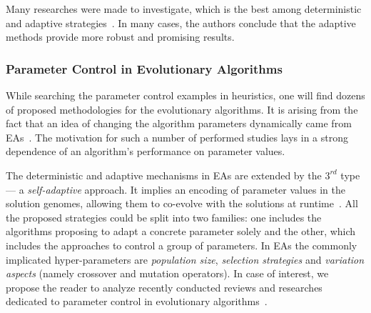 Many researches were made to investigate, which is the best among deterministic and adaptive strategies~\cite{thompson1995general,ingber2000adaptive,de2003placement,azizi2004adaptive,lou2016parallel}. In many cases, the authors conclude that the adaptive methods provide more robust and promising results.


\subsubsection{Parameter Control in Evolutionary Algorithms}
While searching the parameter control examples in heuristics, one will find dozens of proposed methodologies for the evolutionary algorithms. It is arising from the fact that an idea of changing the algorithm parameters dynamically came from EAs~\cite{karafotias2014parameter}. The motivation for such a number of performed studies lays in a strong dependence of an algorithm's performance on parameter values. 

The deterministic and adaptive mechanisms in EAs are extended by the $3^{rd}$ type — a \emph{self-adaptive} approach. It implies an encoding of parameter values in the solution genomes, allowing them to co-evolve with the solutions at runtime~\cite{doerr2020theory}. All the proposed strategies could be split into two families: one includes the algorithms proposing to adapt a concrete parameter solely and the other, which includes the approaches to control a group of parameters. In EAs the commonly implicated hyper-parameters are \emph{population size}, \emph{selection strategies} and \emph{variation aspects} (namely crossover and mutation operators). In case of interest, we propose the reader to analyze recently conducted reviews and researches dedicated to parameter control in evolutionary algorithms~\cite{karafotias2014parameter,aleti2016systematic,smith2020self,doerr2020theory}.

